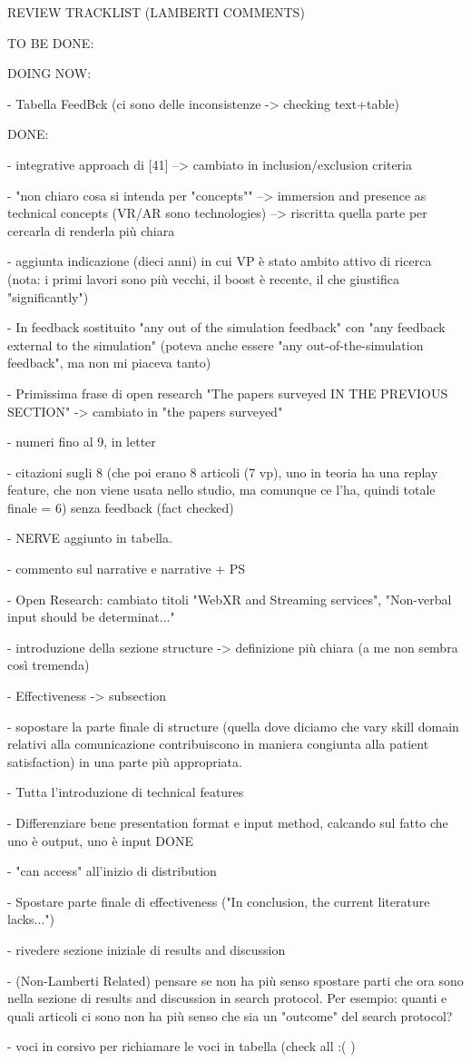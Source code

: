 REVIEW TRACKLIST (LAMBERTI COMMENTS)

TO BE DONE:


DOING NOW:

- Tabella FeedBck (ci sono delle inconsistenze -> checking text+table)

DONE:

- integrative approach di [41] --> cambiato in inclusion/exclusion criteria

- "non chiaro cosa si intenda per "concepts"" --> immersion and presence as technical concepts (VR/AR sono technologies) --> riscritta quella parte per cercarla di renderla più chiara

- aggiunta indicazione (dieci anni) in cui VP è stato ambito attivo di ricerca (nota: i primi lavori sono più vecchi, il boost è recente, il che giustifica "significantly")

- In feedback sostituito "any out of the simulation feedback" con "any feedback external to the simulation" (poteva anche essere "any out-of-the-simulation feedback", ma non mi piaceva tanto)

- Primissima frase di open research "The papers surveyed IN THE PREVIOUS SECTION" -> cambiato in "the papers surveyed"

- numeri fino al 9, in letter 

- citazioni sugli 8 (che poi erano 8 articoli (7 vp), uno in teoria ha una replay feature, che non viene usata nello studio, ma comunque ce l'ha, quindi totale finale = 6) senza feedback (fact checked)

- NERVE aggiunto in tabella.

- commento sul narrative e narrative + PS

- Open Research: cambiato  titoli "WebXR and Streaming services", "Non-verbal input should be determinat..."


- introduzione della sezione structure -> definizione più chiara (a me non sembra così tremenda)

- Effectiveness -> subsection

- sopostare la parte finale di structure (quella dove diciamo che vary skill domain relativi alla comunicazione contribuiscono in maniera congiunta alla patient satisfaction) in una parte più appropriata.

- Tutta l'introduzione di technical features

- Differenziare bene presentation format e input method, calcando sul fatto che uno è output, uno è input DONE

- "can access" all'inizio di distribution

- Spostare parte finale di effectiveness ("In conclusion, the current literature lacks...")

- rivedere sezione iniziale di results and discussion

- (Non-Lamberti Related) pensare se non ha più senso spostare parti che ora sono nella sezione di results and discussion in search protocol. Per esempio: quanti e quali articoli ci sono non ha più senso che sia un "outcome" del search protocol?


- voci in corsivo per richiamare le voci in tabella (check all :( )
